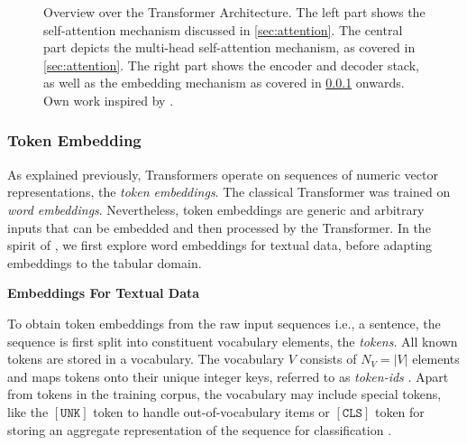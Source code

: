 \begin{landscape}
    \begin{figure}[ht]
        \centering
        {\renewcommand\normalsize{\scriptsize}%
            \normalsize
            }
        \caption[Overview Over the Transformer Architecture]{Overview over the Transformer Architecture. The left part shows the self-attention mechanism discussed in \cref{sec:attention}. The central part depicts the multi-head self-attention mechanism, as covered in \cref{sec:attention}. The right part shows the encoder and decoder stack, as well as the \gls{embedding} mechanism as covered in \cref{sec:token-embeddings} onwards. Own work inspired by \textcite[][3]{tayEfficientTransformersSurvey2022}.}
        \label{fig:transformer-architecture-overview}
    \end{figure}
\end{landscape}

\subsubsection{Token Embedding}\label{sec:token-embeddings}

As explained previously, Transformers operate on sequences of numeric vector representations, the \emph{token embeddings}. The classical Transformer was trained on \emph{word embeddings}. Nevertheless, \gls{token} embeddings are generic and arbitrary inputs that can be embedded and then processed by the Transformer. In the spirit of \textcite[][5]{vaswaniAttentionAllYou2017}, we first explore word embeddings for textual data, before adapting embeddings to the tabular domain.


\textbf{Embeddings For Textual Data}

To obtain \gls{token} embeddings from the raw input sequences i.e., a sentence, the sequence is first split into constituent vocabulary elements, the \emph{tokens}. All known \glspl{token} are stored in a vocabulary. The vocabulary $V$ consists of $N_{V}=|V|$ elements and maps \glspl{token} onto their unique integer keys, referred to as \emph{token-ids} \autocite[][3]{phuongFormalAlgorithmsTransformers2022}. Apart from \glspl{token} in the training corpus, the vocabulary may include special \glspl{token}, like the $\mathtt{[UNK]}$ \gls{token} to handle out-of-vocabulary items or $\mathtt{[CLS]}$ \gls{token} for storing an aggregate representation of the sequence for classification \autocite[cp.][4]{devlinBERTPretrainingDeep2019}.

